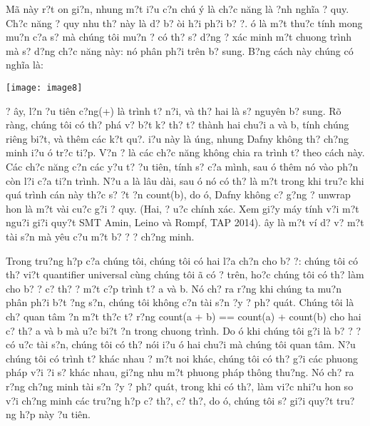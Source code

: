 \documentclass{article} %
\begin{document}
M\~{a} n\`{a}y r?t {\dj}on gi?n, nhung m?t {\dj}i?u c?n ch\'{u} \'{y} l\`{a} ch?c n\u{a}ng l\`{a} {\dj}?nh ngh\~{i}a {\dj}? quy. Ch?c n\u{a}ng {\dj}? quy nhu th? n\`{a}y l\`{a} d? b? {\dj}\`{o}i h?i ph?i b? {\dj}?. {\DJ}\'{o} l\`{a} m?t thu?c t\'{i}nh mong mu?n c?a s? m\`{a} ch\'{u}ng t\^{o}i mu?n {\dj}? c\'{o} th? s? d?ng {\dj}? x\'{a}c minh m?t chuong tr\`{i}nh m\`{a} s? d?ng ch?c n\u{a}ng n\`{a}y: n\'{o} ph\^{a}n ph?i tr\^{e}n b? sung. B?ng c\'{a}ch n\`{a}y ch\'{u}ng c\'{o} ngh\~{i}a l\`{a}:

\noindent \texttt{[image: image8]}

? {\dj}\^{a}y, l?n {\dj}?u ti\^{e}n c?ng(+) l\`{a} tr\`{i}nh t? n?i, v\`{a} th? hai l\`{a} s? nguy\^{e}n b? sung. R\~{o} r\`{a}ng, ch\'{u}ng t\^{o}i c\'{o} th? ph\'{a} v? b?t k? th? t? th\`{a}nh hai chu?i a v\`{a} b, t\'{i}nh ch\'{u}ng ri\^{e}ng bi?t, v\`{a} th\^{e}m c\'{a}c k?t qu?. {\DJ}i?u n\`{a}y l\`{a} {\dj}\'{u}ng, nhung Dafny kh\^{o}ng th? ch?ng minh {\dj}i?u {\dj}\'{o} tr?c ti?p. V?n {\dj}? l\`{a} c\'{a}c ch?c n\u{a}ng kh\^{o}ng chia ra tr\`{i}nh t? theo c\'{a}ch n\`{a}y. C\'{a}c ch?c n\u{a}ng c?n c\'{a}c y?u t? {\dj}?u ti\^{e}n, t\'{i}nh s? c?a m\`{i}nh, sau {\dj}\'{o} th\^{e}m n\'{o} v\`{a}o ph?n c\`{o}n l?i c?a ti?n tr\`{i}nh. N?u a l\`{a} l\^{a}u d\`{a}i, sau {\dj}\'{o} n\'{o} c\'{o} th? l\`{a} m?t trong khi tru?c khi qu\'{a} tr\`{i}nh c\'{a}n n\`{a}y th?c s? {\dj}?t {\dj}?n count(b), do {\dj}\'{o}, Dafny kh\^{o}ng c? g?ng {\dj}? unwrap hon l\`{a} m?t v\`{a}i cu?c g?i {\dj}? quy. (Hai, {\dj}? {\dj}u?c ch\'{i}nh x\'{a}c. Xem gi?y m\'{a}y t\'{i}nh v?i m?t ngu?i gi?i quy?t SMT Amin, Leino v\`{a} Rompf, TAP 2014). {\DJ}\^{a}y l\`{a} m?t v\'{i} d? v? m?t t\`{a}i s?n m\`{a} y\^{e}u c?u m?t b? {\dj}? {\dj}? ch?ng minh.

Trong tru?ng h?p c?a ch\'{u}ng t\^{o}i, ch\'{u}ng t\^{o}i c\'{o} hai l?a ch?n cho b? {\dj}?: ch\'{u}ng t\^{o}i c\'{o} th? vi?t quantifier universal c\`{u}ng ch\'{u}ng t\^{o}i {\dj}\~{a} c\'{o} ? tr\^{e}n, ho?c ch\'{u}ng t\^{o}i c\'{o} th? l\`{a}m cho b? {\dj}? c? th? {\dj}? m?t c?p tr\`{i}nh t? a v\`{a} b. N\'{o} ch? ra r?ng khi ch\'{u}ng ta mu?n ph\^{a}n ph?i b?t {\dj}?ng s?n, ch\'{u}ng t\^{o}i kh\^{o}ng c?n t\`{a}i s?n {\dj}?y {\dj}? ph? qu\'{a}t. Ch\'{u}ng t\^{o}i l\`{a} ch? quan t\^{a}m {\dj}?n m?t th?c t? r?ng count(a + b) == count(a) + count(b) cho hai c? th? a v\`{a} b m\`{a} {\dj}u?c bi?t {\dj}?n trong chuong tr\`{i}nh. Do {\dj}\'{o} khi ch\'{u}ng t\^{o}i g?i l\`{a} b? {\dj}? {\dj}? c\'{o} {\dj}u?c t\`{a}i s?n, ch\'{u}ng t\^{o}i c\'{o} th? n\'{o}i {\dj}i?u {\dj}\'{o} hai chu?i m\`{a} ch\'{u}ng t\^{o}i quan t\^{a}m. N?u ch\'{u}ng t\^{o}i c\'{o} tr\`{i}nh t? kh\'{a}c nhau ? m?t noi kh\'{a}c, ch\'{u}ng t\^{o}i c\'{o} th? g?i c\'{a}c phuong ph\'{a}p v?i {\dj}?i s? kh\'{a}c nhau, gi?ng nhu m?t phuong ph\'{a}p th\^{o}ng thu?ng. N\'{o} ch? ra r?ng ch?ng minh t\`{a}i s?n {\dj}?y {\dj}? ph? qu\'{a}t, trong khi c\'{o} th?, l\`{a}m vi?c nhi?u hon so v?i ch?ng minh c\'{a}c tru?ng h?p c? th?, c? th?, do {\dj}\'{o}, ch\'{u}ng t\^{o}i s? gi?i quy?t tru?ng h?p n\`{a}y {\dj}?u ti\^{e}n.
\end{document}
